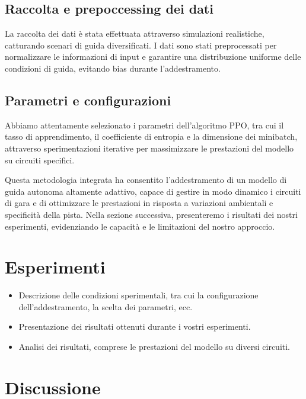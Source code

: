 \documentclass[conference]{IEEEtran}
\begin{document}
\subsection{Raccolta e prepoccessing dei dati}
La raccolta dei dati è stata effettuata attraverso simulazioni realistiche, catturando scenari di guida diversificati. I dati sono stati preprocessati per normalizzare le informazioni di input e garantire una distribuzione uniforme delle condizioni di guida, evitando bias durante l'addestramento.

\subsection{Parametri e configurazioni}
Abbiamo attentamente selezionato i parametri dell'algoritmo PPO, tra cui il tasso di apprendimento, il coefficiente di entropia e la dimensione dei minibatch, attraverso sperimentazioni iterative per massimizzare le prestazioni del modello su circuiti specifici.

\medskip

Questa metodologia integrata ha consentito l'addestramento di un modello di guida autonoma altamente adattivo, capace di gestire in modo dinamico i circuiti di gara e di ottimizzare le prestazioni in risposta a variazioni ambientali e specificità della pista. Nella sezione successiva, presenteremo i risultati dei nostri esperimenti, evidenziando le capacità e le limitazioni del nostro approccio.


\section{Esperimenti}

\begin{itemize}
    \item Descrizione delle condizioni sperimentali, tra cui la configurazione dell'addestramento, la scelta dei parametri, ecc.

    \item Presentazione dei risultati ottenuti durante i vostri esperimenti.

    \item Analisi dei risultati, comprese le prestazioni del modello su diversi circuiti.

\end{itemize}

\section{Discussione}
\end{document}
